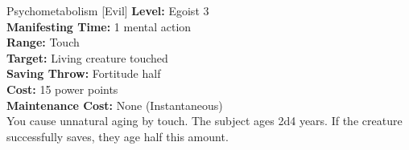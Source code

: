 {Psychometabolism [Evil]}
{
	\textbf{Level:}
	Egoist 3\\
	\textbf{Manifesting Time:}
	1 mental action\\
	\textbf{Range:}
	Touch\\
	\textbf{Target:}
	Living creature touched\\
	\textbf{Saving Throw:}
	Fortitude half\\
	\textbf{Cost:}
	15 power points\\
	\textbf{Maintenance Cost:}
	None (Instantaneous)\\
}
{
	You cause unnatural aging by touch. The subject ages 2d4 years. If the creature successfully saves, they age half this amount.
}